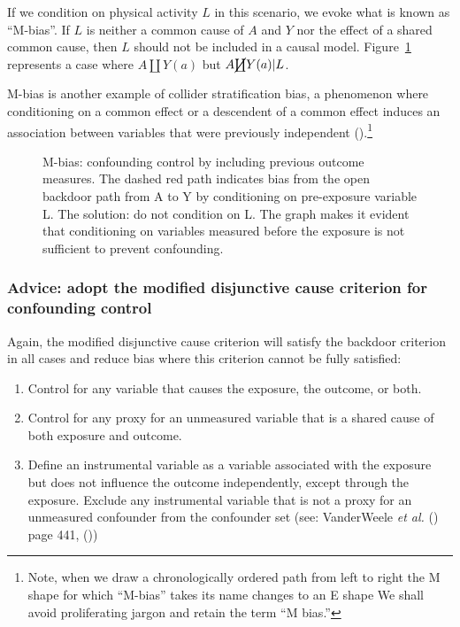 \documentclass[
  singlecolumn]{article}
\providecommand{\tightlist}{%
  \setlength{\itemsep}{0pt}\setlength{\parskip}{0pt}}\usepackage{longtable,booktabs,array}
\begin{document}
If we condition on physical activity \(L\) in this scenario, we evoke
what is known as ``M-bias''. If \(L\) is neither a common cause of \(A\)
and \(Y\) nor the effect of a shared common cause, then \(L\) should not
be included in a causal model. Figure~\ref{fig-m-bias} represents a case
where \(A \coprod Y(a)\) but \(A \cancel{\coprod} Y(a)| L\).

M-bias is another example of collider stratification bias, a phenomenon
where conditioning on a common effect or a descendent of a common effect
induces an association between variables that were previously
independent ().\footnote{Note, when we draw a chronologically ordered path from
  left to right the M shape for which ``M-bias'' takes its name changes
  to an E shape We shall avoid proliferating jargon and retain the term
  ``M bias.''}

\begin{figure}[htb]


\caption{\label{fig-m-bias}M-bias: confounding control by including
previous outcome measures. The dashed red path indicates bias from the
open backdoor path from A to Y by conditioning on pre-exposure variable
L. The solution: do not condition on L. The graph makes it evident that
conditioning on variables measured before the exposure is not sufficient
to prevent confounding.}

\end{figure}%

\subsubsection{Advice: adopt the modified disjunctive cause criterion
for confounding
control}\label{advice-adopt-the-modified-disjunctive-cause-criterion-for-confounding-control}

Again, the modified disjunctive cause criterion will satisfy the
backdoor criterion in all cases and reduce bias where this criterion
cannot be fully satisfied:

\begin{enumerate}
\def\labelenumi{\alph{enumi}.}
\tightlist
\item
  Control for any variable that causes the exposure, the outcome, or
  both.
\item
  Control for any proxy for an unmeasured variable that is a shared
  cause of both exposure and outcome.
\item
  Define an instrumental variable as a variable associated with the
  exposure but does not influence the outcome independently, except
  through the exposure. Exclude any instrumental variable that is not a
  proxy for an unmeasured confounder from the confounder set (see:
  VanderWeele \emph{et al.} () page
  441, ())
\end{enumerate}
\end{document}
